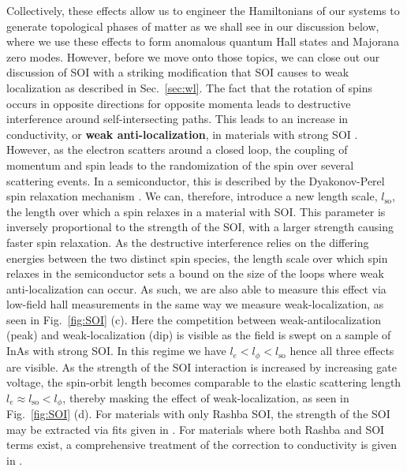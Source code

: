 Collectively, these effects allow us to engineer the Hamiltonians of our systems to generate topological phases of matter as we shall see in our discussion below,
where we use these effects to form anomalous quantum Hall states and Majorana zero modes. However, before we move onto those topics, we can close out our discussion of SOI
with a striking modification that SOI causes to weak localization as described in Sec.~\ref{sec:wl}. The fact that the rotation of spins occurs in opposite
directions for opposite momenta leads to destructive interference around self-intersecting paths. This leads to an increase in conductivity, or \textbf{weak anti-localization},
in materials with strong SOI \cite{10.1143/PTP.63.707}. However, as the electron scatters around a closed loop, the coupling of momentum and spin leads to the randomization of
the spin over several scattering events. In a semiconductor, this is described by the Dyakonov-Perel spin relaxation
mechanism \cite{DYAKONOV1971459}. We can, therefore, introduce a new length scale, $l_\textrm{so}$, the length over which a spin relaxes in a material with SOI.
This parameter is inversely proportional to the strength of the SOI, with a larger strength causing faster spin relaxation.
As the destructive interference relies on the differing energies between the two distinct spin species, the length scale over which spin relaxes in the semiconductor sets
a bound on the size of the loops where weak anti-localization can occur. As such, we are also able to measure
this effect via low-field hall measurements in the same way we measure weak-localization, as seen in Fig.~\ref{fig:SOI} (c). Here the competition between
weak-antilocalization (peak) and weak-localization (dip) is visible as the field is swept on a sample of InAs with strong SOI. In this regime we have $l_e < l_\phi < l_\textrm{so}$
hence all three effects are visible. As the strength of the SOI interaction is increased by increasing gate voltage, the spin-orbit length becomes comparable to the elastic
scattering length $l_e \approx l_\textrm{so} < l_\phi$, thereby masking the effect of weak-localization, as seen in Fig.~\ref{fig:SOI} (d). For materials with only
Rashba SOI, the strength of the SOI may be extracted via fits given in \cite{10.1143/PTP.63.707}. For materials where both Rashba and SOI terms exist, a comprehensive
treatment of the correction to conductivity is given in \cite{PhysRevB.53.3912}.

